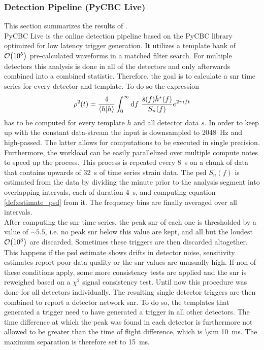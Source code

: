 \subsubsection{Detection Pipeline (PyCBC Live)}
This section summarizes the results of \cite{pycbc_live}.\\
PyCBC Live is the online detection pipeline based on the PyCBC library optimized for low latency trigger generation. It utilizes a template bank of $\mathcal{O}{\left( 10^5 \right)}$ pre-calculated waveforms in a matched filter search. For multiple detectors this analysis is done in all of the detectors and only afterwards combined into a combined statistic. Therefore, the goal is to calculate a \gls{snr} time series for every detector and template. To do so the expression
\begin{equation}
\rho^2(t) = \frac{4}{\langle h|h\rangle}\int_0^\infty\diff f\ \frac{\tilde{s}(f)\tilde{h}^\ast(f)}{S_n(f)}e^{2\pi i f t}
\end{equation}
has to be computed for every template $h$ and all detector data $s$. In order to keep up with the constant data-stream the input is downsampled to \SI{2048}{\hertz} and high-passed. The latter allows for computations to be executed in single precision. Furthermore, the workload can be easily parallelized over multiple compute notes to speed up the process. This process is repeated every \SI{8}{\s} on a chunk of data that contains upwards of \SI{32}{\s} of time series strain data. The \gls{psd} $S_n(f)$ is estimated from the data by dividing the minute prior to the analysis segment into overlapping intervals, each of duration \SI{4}{\s}, and computing equation \eqref{def:estimate_psd} from it. The frequency bins are finally averaged over all intervals.\\
After computing the \gls{snr} time series, the peak \gls{snr} of each one is thresholded by a value of $\sim 5.5$, i.e. no peak \gls{snr} below this value are kept, and all but the loudest $\mathcal{O}{\left( 10^3 \right)}$ are discarded. Sometimes these triggers are then discarded altogether. This happens if the \gls{psd} estimate shows drifts in detector noise, sensitivity estimates report poor data quality or the \gls{snr} values are unusually high. If non of these conditions apply, some more consistency tests are applied and the \gls{snr} is reweighed based on a $\chi^2$ signal consistency test. Until now this procedure was done for all detectors individually. The resulting single detector triggers are then combined to report a detector network \gls{snr}. To do so, the templates that generated a trigger need to have generated a trigger in all other detectors. The time difference at which the peak was found in each detector is furthermore not allowed to be greater than the time of flight difference, which is \SI{\sim 10}{\milli\s}. The maximum separation is therefore set to \SI{15}{\milli\s}.\\
